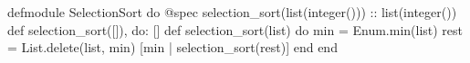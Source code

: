defmodule SelectionSort do
  @spec selection_sort(list(integer())) :: list(integer())
  def selection_sort([]), do: []
  def selection_sort(list) do
    min = Enum.min(list)
    rest = List.delete(list, min)
    [min | selection_sort(rest)]
  end
end
